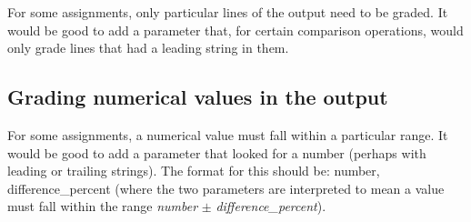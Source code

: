\documentclass[12pt]{article}
\begin{document}
For some assignments, only particular lines of the output need to be graded. It would be good to add a parameter that, for certain comparison operations, would only grade lines that had a leading string in them.

\subsection{Grading numerical values in the output} \label{sec:numericvalues}

For some assignments, a numerical value must fall within a particular range. It would be good to add a parameter that looked for a number (perhaps with leading or trailing strings). The format for this should be: number, difference\_percent (where the two parameters are interpreted to mean a value must fall within the range \textit{number} $\pm$ \textit{difference\_percent}).
\end{document}
